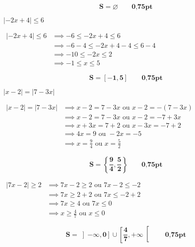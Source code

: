 \documentclass[12pt,a4paper]{article}
\begin{document}
\begin{enumerate}
\begin{tcolorbox}[colback=yellow!20, colframe=black, sharp corners]
    \[
    \mathbf{S = \varnothing}\quad\quad \textbf{0,75pt}
    \]
\end{tcolorbox}

\( |-2x + 4| \leq 6 \)

\(
\begin{aligned}
|-2x + 4| \leq 6 &\implies -6 \leq -2x + 4 \leq 6\\
								 &\implies -6 - 4 \leq -2x + 4 - 4 \leq 6 - 4\\
								 &\implies -10 \leq -2x \leq 2 \\
								 &\implies -1 \leq x \leq 5
\end{aligned}
\)

\begin{tcolorbox}[colback=yellow!20, colframe=black, sharp corners]
    \[
    \mathbf{S = [-1, 5]}\quad\quad \textbf{0,75pt}
    \]
\end{tcolorbox}

\( |x - 2| = |7 - 3x| \)

\(
\begin{aligned}
|x - 2| = |7 - 3x| &\implies x - 2 = 7 - 3x \text{ ou } x - 2 = - (7 - 3x) \\
									 &\implies x - 2 = 7 - 3x \text{ ou } x - 2 = -7 + 3x \\
									 &\implies x + 3x = 7 + 2 \text{ ou } x - 3x = -7 + 2 \\
									 &\implies 4x = 9 \text{ ou } -2x = -5 \\
									 &\implies x = \frac{9}{4} \text{ ou } x = \frac{5}{2}
\end{aligned}
\)

\begin{tcolorbox}[colback=yellow!20, colframe=black, sharp corners]
    \[
    \mathbf{S = \left\{ \frac{9}{4}, \frac{5}{2} \right\}}\quad\quad \textbf{0,75pt}
    \]
\end{tcolorbox}

\bigskip

\(
\begin{aligned}
|7x - 2| \geq 2 &\implies 7x - 2 \geq 2 \text{ ou } 7x - 2 \leq -2 \\
                &\implies 7x \geq 2 + 2 \text{ ou } 7x \leq -2 + 2 \\
                &\implies 7x \geq 4 \text{ ou } 7x \leq 0 \\
                &\implies x \geq \frac{4}{7} \text{ ou } x \leq 0
\end{aligned}
\)
\begin{tcolorbox}[colback=yellow!20, colframe=black, sharp corners]
    \[
    \mathbf{S = \left] -\infty, 0 \right] \cup \left[ \frac{4}{7}, +\infty \right[}\quad\quad \textbf{0,75pt}
    \]
\end{tcolorbox}
\end{enumerate}
\end{document}
